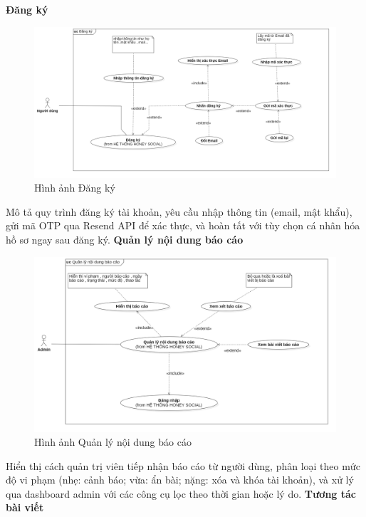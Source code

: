 \textbf{Đăng ký} \\
\begin{figure}[H]
    \centering
    \includegraphics[width=1\textwidth]{image/MoHinh/10.png}
    \caption{Hình ảnh Đăng ký}
    \label{fig:dang_ky}
\end{figure}
Mô tả quy trình đăng ký tài khoản, yêu cầu nhập thông tin (email, mật khẩu), gửi mã OTP qua Resend API để xác thực, và hoàn tất với tùy chọn cá nhân hóa hồ sơ ngay sau đăng ký.
\newpage
\textbf{Quản lý nội dung báo cáo} \\
\begin{figure}[H]
    \centering
    \includegraphics[width=1\textwidth]{image/MoHinh/11.png}
    \caption{Hình ảnh Quản lý nội dung báo cáo}
    \label{fig:quan_ly_noi_dung_bao_cao}
\end{figure}
Hiển thị cách quản trị viên tiếp nhận báo cáo từ người dùng, phân loại theo mức độ vi phạm (nhẹ: cảnh báo; vừa: ẩn bài; nặng: xóa và khóa tài khoản), và xử lý qua dashboard admin với các công cụ lọc theo thời gian hoặc lý do.
\newpage
\textbf{Tương tác bài viết} \\
